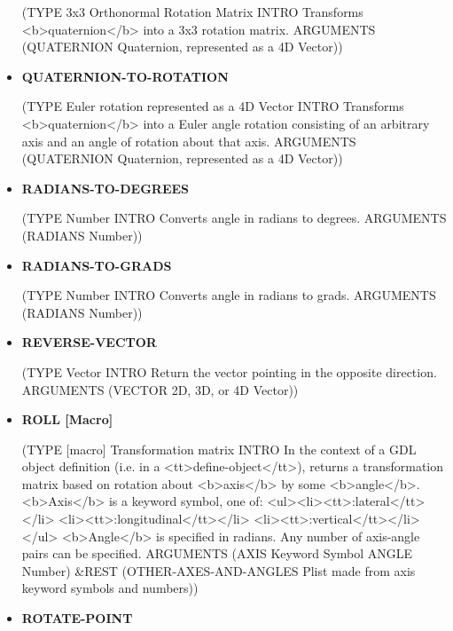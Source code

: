 \documentclass [11pt]{book}
\begin{document}
\begin{itemize}
(TYPE 3x3 Orthonormal Rotation Matrix INTRO  Transforms <b>quaternion</b> into a 3x3 rotation matrix.
 ARGUMENTS (QUATERNION Quaternion, represented as a 4D Vector))



\item {}
\label{prim:quaternion-to-rotation}
\textbf{QUATERNION-TO-ROTATION}

(TYPE Euler rotation represented as a 4D Vector INTRO  Transforms <b>quaternion</b> into a
Euler angle rotation consisting of an arbitrary axis and an angle of rotation about
that axis.
 ARGUMENTS (QUATERNION Quaternion, represented as a 4D Vector))



\item {}
\label{prim:radians-to-degrees}
\textbf{RADIANS-TO-DEGREES}

(TYPE Number INTRO  Converts angle in radians to degrees.
 ARGUMENTS (RADIANS Number))



\item {}
\label{prim:radians-to-grads}
\textbf{RADIANS-TO-GRADS}

(TYPE Number INTRO  Converts angle in radians to grads.
 ARGUMENTS (RADIANS Number))



\item {}
\label{prim:reverse-vector}
\textbf{REVERSE-VECTOR}

(TYPE Vector INTRO  Return the vector pointing in the opposite direction.
 ARGUMENTS (VECTOR 2D, 3D, or 4D Vector))



\item {}
\label{prim:roll}
\textbf{ROLL [Macro]}

(TYPE [macro] Transformation matrix INTRO  In the context of a GDL object
definition (i.e. in a <tt>define-object</tt>), returns a transformation
matrix based on rotation about <b>axis</b> by some <b>angle</b>.
<b>Axis</b> is a keyword symbol, one of:
<ul><li><tt>:lateral</tt></li>
<li><tt>:longitudinal</tt></li>
<li><tt>:vertical</tt></li></ul>
<b>Angle</b> is specified in radians. Any number of axis-angle
pairs can be specified.
 ARGUMENTS (AXIS Keyword Symbol ANGLE Number) \&REST (OTHER-AXES-AND-ANGLES Plist made from axis keyword symbols and numbers))



\item {}
\label{prim:rotate-point}
\textbf{ROTATE-POINT}


\end{itemize}
\end{document}
